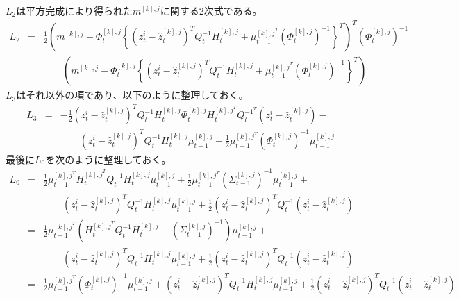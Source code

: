 \documentclass[dvipdfmx,a4paper]{jsarticle}
\begin{document}
$L_2$は平方完成により得られた$m^{[k], j}$に関する2次式である。
\begin{eqnarray}
	L_2 &=& \frac{1}{2} \left( m^{[k], j} - \Phi_t^{[k], j} \left\{ \left( z_t^i - \widehat{z}_t^{[k], j} \right)^T Q_t^{-1} H_t^{[k], j} + \mu_{t - 1}^{{[k], j}^T} \left( \Phi_t^{[k], j} \right)^{-1} \right\}^T \right)^T \left( \Phi_t^{[k], j} \right)^{-1} \nonumber \\
	&& \qquad \left( m^{[k], j} - \Phi_t^{[k], j} \left\{ \left( z_t^i - \widehat{z}_t^{[k], j} \right)^T Q_t^{-1} H_t^{[k], j} + \mu_{t - 1}^{{[k], j}^T} \left( \Phi_t^{[k], j} \right)^{-1} \right\}^T \right) \nonumber
\end{eqnarray}
$L_3$はそれ以外の項であり、以下のように整理しておく。
\begin{eqnarray}
	L_3 &=& -\frac{1}{2} \left( z_t^i - \widehat{z}_t^{[k], j} \right)^T Q_t^{-1} H_t^{[k], j} \Phi_t^{[k], j} H_t^{{[k], j}^T} Q_t^{{-1}^T} \left( z_t^i - \widehat{z}_t^{[k], j} \right) - \nonumber \\
	&& \qquad \left( z_t^i - \widehat{z}_t^{[k], j} \right)^T Q_t^{-1} H_t^{[k], j} \mu_{t - 1}^{[k], j} - \frac{1}{2} \mu_{t - 1}^{{[k], j}^T} \left( \Phi_t^{[k], j} \right)^{-1} \mu_{t - 1}^{[k], j} \nonumber
\end{eqnarray}
最後に$L_0$を次のように整理しておく。
\begin{eqnarray}
	L_0 &=& \frac{1}{2} \mu_{t - 1}^{{[k], j}^T} H_t^{{[k], j}^T} Q_t^{-1} H_t^{[k], j} \mu_{t - 1}^{[k], j} + \frac{1}{2} \mu_{t - 1}^{{[k], j}^T} \left( \Sigma_{t - 1}^{[k], j} \right)^{-1} \mu_{t - 1}^{[k], j} + \nonumber \\
	&& \qquad \left( z_t^i - \widehat{z}_t^{[k], j} \right)^T Q_t^{-1} H_t^{[k], j} \mu_{t - 1}^{[k], j} + \frac{1}{2} \left( z_t^i - \widehat{z}_t^{[k], j} \right)^T Q_t^{-1} \left( z_t^i - \widehat{z}_t^{[k], j} \right) \nonumber \\
	&=& \frac{1}{2} \mu_{t - 1}^{{[k], j}^T} \left( H_t^{{[k], j}^T} Q_t^{-1} H_t^{[k], j} + \left( \Sigma_{t - 1}^{[k], j} \right)^{-1} \right) \mu_{t - 1}^{[k], j} + \nonumber \\
	&& \qquad \left( z_t^i - \widehat{z}_t^{[k], j} \right)^T Q_t^{-1} H_t^{[k], j} \mu_{t - 1}^{[k], j} + \frac{1}{2} \left( z_t^i - \widehat{z}_t^{[k], j} \right)^T Q_t^{-1} \left( z_t^i - \widehat{z}_t^{[k], j} \right) \nonumber \\
	&=& \frac{1}{2} \mu_{t - 1}^{{[k], j}^T} \left( \Phi_t^{[k], j} \right)^{-1} \mu_{t - 1}^{[k], j} + \left( z_t^i - \widehat{z}_t^{[k], j} \right)^T Q_t^{-1} H_t^{[k], j} \mu_{t - 1}^{[k], j} + \frac{1}{2} \left( z_t^i - \widehat{z}_t^{[k], j} \right)^T Q_t^{-1} \left( z_t^i - \widehat{z}_t^{[k], j} \right) \nonumber
\end{eqnarray}
\end{document}
